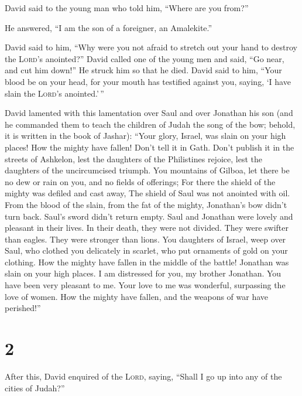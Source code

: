  David said to the young man who told him, ``Where are
you from?''

He answered, ``I am the son of a foreigner, an Amalekite.''

 David said to him, ``Why were you not afraid to stretch
out your hand to destroy the \textsc{Lord}'s anointed?'' 
David called one of the young men and said, ``Go near, and cut him
down!'' He struck him so that he died.  David said to
him, ``Your blood be on your head, for your mouth has testified against
you, saying, `I have slain the \textsc{Lord}'s anointed.'\,''

 David lamented with this lamentation over Saul and over
Jonathan his son  (and he commanded them to teach the
children of Judah the song of the bow; behold, it is written in the book
of Jashar):  ``Your glory, Israel, was slain on your high
places! How the mighty have fallen!  Don't tell it in
Gath. Don't publish it in the streets of Ashkelon, lest the daughters of
the Philistines rejoice, lest the daughters of the uncircumcised
triumph.  You mountains of Gilboa, let there be no dew or
rain on you, and no fields of offerings; For there the shield of the
mighty was defiled and cast away, The shield of Saul was not anointed
with oil.  From the blood of the slain, from the fat of
the mighty, Jonathan's bow didn't turn back. Saul's sword didn't return
empty.  Saul and Jonathan were lovely and pleasant in
their lives. In their death, they were not divided. They were swifter
than eagles. They were stronger than lions.  You
daughters of Israel, weep over Saul, who clothed you delicately in
scarlet, who put ornaments of gold on your clothing.  How
the mighty have fallen in the middle of the battle! Jonathan was slain
on your high places.  I am distressed for you, my brother
Jonathan. You have been very pleasant to me. Your love to me was
wonderful, surpassing the love of women.  How the mighty
have fallen, and the weapons of war have perished!''

\hypertarget{section-1}{%
\section{2}\label{section-1}}

 After this, David enquired of the \textsc{Lord}, saying,
``Shall I go up into any of the cities of Judah?''

